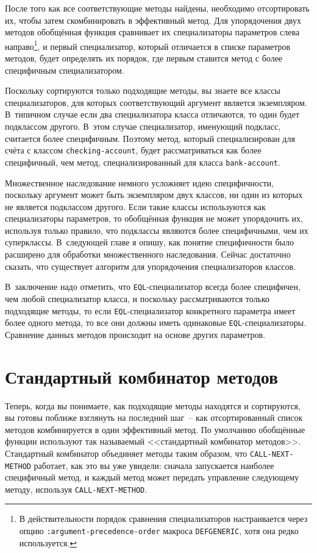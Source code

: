 После того как все соответствующие методы найдены, необходимо отсортировать их, чтобы
затем скомбинировать в эффективный метод.  Для упорядочения двух методов обобщённая
функция сравнивает их специализаторы параметров слева направо\footnote{В
  действительности порядок сравнения специализаторов настраивается через опцию
  \lstinline{:argument-precedence-order} макроса \lstinline{DEFGENERIC}, хотя она редко
  используется.}\hspace{\footnotenegspace}, и первый специализатор, который отличается в списке параметров методов,
будет определять их порядок, где первым ставится метод с более специфичным
специализатором.

Поскольку сортируются только подходящие методы, вы знаете все классы специализаторов, для
которых соответствующий аргумент является экземпляром.  В~типичном случае если два
специализатора класса отличаются, то один будет подклассом другого.  В~этом случае
специализатор, именующий подкласс, считается более специфичным.  Поэтому метод, который
специализирован для счёта с классом \lstinline{checking-account}, будет рассматриваться как
более специфичный, чем метод, специализированный для класса \lstinline{bank-account}.

Множественное наследование немного усложняет идею специфичности, поскольку аргумент может
быть экземпляром двух классов, ни один из которых не является подклассом другого.  Если
такие классы используются как специализаторы параметров, то обобщённая функция не может
упорядочить их, используя только правило, что подклассы являются более специфичными, чем их
суперклассы.  В~следующей главе я опишу, как понятие специфичности было расширено для
обработки множественного наследования.  Сейчас достаточно сказать, что существует алгоритм
для упорядочения специализаторов классов.

В~заключение надо отметить, что \lstinline{EQL}-специализатор всегда более специфичен, чем
любой специализатор класса, и поскольку рассматриваются только подходящие методы, то если
\lstinline{EQL}-специализатор конкретного параметра имеет более одного метода, то все они
должны иметь одинаковые \lstinline{EQL}-специализаторы.  Сравнение данных методов происходит на
основе других параметров.

\section{Стандартный комбинатор методов}

Теперь, когда вы понимаете, как подходящие методы находятся и сортируются, вы готовы
поближе взглянуть на последний шаг~-- как отсортированный список методов комбинируется в
один эффективный метод.  По умолчанию обобщённые функции используют так называемый
<<стандартный комбинатор методов>>.  Стандартный комбинатор объединяет методы таким образом,
что \lstinline{CALL-NEXT-METHOD} работает, как это вы уже увидели: сначала запускается
наиболее специфичный метод, и каждый метод может передать управление следующему методу,
используя \lstinline{CALL-NEXT-METHOD}.

